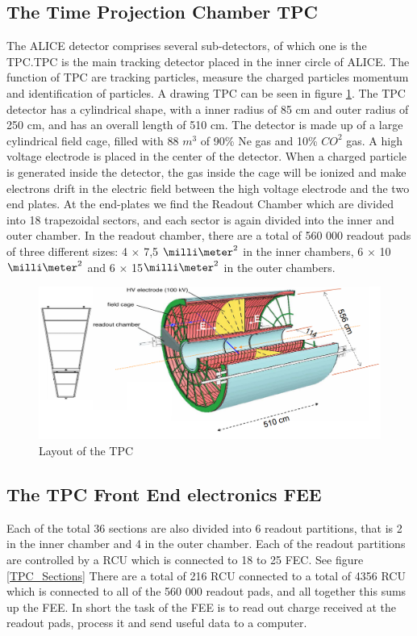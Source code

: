 \documentclass[12pt]{article}
\numberwithin{figure}{section}
\begin{document}
\FloatBarrier

\subsection{The Time Projection Chamber TPC}
The ALICE detector comprises several sub-detectors, of which one is the \acf{TPC}.\ac{TPC} is the main tracking detector placed in the inner circle of \ac{ALICE}.
The function of \ac{TPC} are tracking particles, measure the charged particles momentum and identification of particles.
A drawing \ac{TPC} can be seen in figure \ref{TPC_layout}.
The \ac{TPC} detector has a cylindrical shape, with a inner radius of 85 cm and outer radius of 250 cm, and has an overall length of 510 cm.
The detector is made up of a large cylindrical field cage, filled with 88 $m^3$ of 90\% Ne gas and 10\% $CO^2$ gas.
A high voltage electrode is placed in the center of the detector. When a charged particle is generated inside the detector,
the gas inside the cage will be ionized and make electrons drift in the electric field between the high voltage electrode and the two end plates.
At the end-plates we find the Readout Chamber which are divided into 18 trapezoidal sectors, and each sector is again divided into the inner and outer chamber.
In the readout chamber, there are a total of 560 000 readout pads of three different sizes: 4 $\times$ 7,5 $\milli\meter^2$ in
the inner chambers, 6 $\times$ 10 $\milli\meter^2$ and 6 $\times$ 15$\milli\meter^2$ in the outer chambers.

\begin{figure}[!htbp]
  \centering
  \includegraphics[width=\textwidth]{TPC_layout.png}
  \caption{Layout of the TPC \cite{website:aliceinfo}}
  \label{TPC_layout}
\end{figure}

\subsection{The TPC Front End electronics FEE}
Each of the total 36 sections are also divided into 6 readout partitions, that is 2 in the inner chamber and 4 in the outer chamber. 
Each of the readout partitions are controlled by a \acf{RCU} which is connected to 18 to 25 \acf{FEC}. See figure \ref{TPC_Sections}
There are a total of 216 \ac{RCU} connected to a total of 4356 \ac{RCU} which is connected to all of the 560 000 readout pads, and all together this sums up the \acf{FEE}.
In short the task of the \ac{FEE} is to read out charge received at the readout pads, process it and send useful data to a computer.
\end{document}
